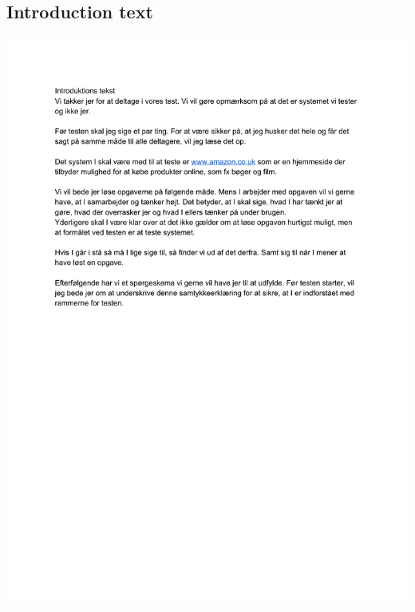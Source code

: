 \documentclass[fleqn]{IOS-Book-Article}
\begin{document}
\subsection{Introduction text} \label{appendix:introductiontext}
\includegraphics[scale=0.8]{./includes/introduktionstekst.pdf}

%





\newpage



%
\end{document}
